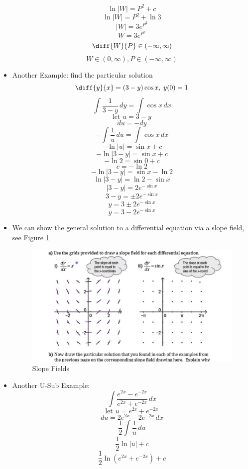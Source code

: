 \documentclass{article}
\newcommand{\letv}[1]{\text{let }#1 = }
\begin{document}
\begin{itemize}
        \[\ln|W| = P^2+c\]
        \[\ln|W| = P^2+\ln3\]
        \[|W| = 3e^{P^2}\]
        \[W = 3e^{P^2}\]
        \[\diff{W}{P}\in(-\infty,\infty)\]
        \[W\in(0,\infty), P\in(-\infty,\infty)\]
    \item Another Example: find the particular solution
        \[\diff{y}{x} = (3-y)\cos x,\;y(0) = 1\]
        \[\int\frac{1}{3-y}\,dy = \int\cos x\,dx\]
        \[\letv{u}3-y\]
        \[du = -dy\]
        \[-\int\frac{1}{u}\,du = \int\cos x\,dx\]
        \[-\ln|u| = \sin x+c\]
        \[-\ln|3-y| = \sin x+c\]
        \[-\ln2 = \sin0+c\]
        \[c = -\ln2\]
        \[-\ln|3-y| = \sin x-\ln2\]
        \[\ln|3-y| = \ln2-\sin x\]
        \[|3-y| = 2e^{-\sin x}\]
        \[3-y = \pm2e^{-\sin x}\]
        \[y = 3\pm2e^{-\sin x}\]
        \[y = 3-2e^{-\sin x}\]
    \item We can show the general solution to a differential equation via a slope field, see Figure \ref{fig:slopeFields}
    \begin{figure}[h]
        \centering
        \includegraphics[width=0.5\linewidth]{images/Slope Fields.jpg}
        \caption{Slope Fields}
        \label{fig:slopeFields}
    \end{figure}
    \item Another U-Sub Example:
        \[\int\frac{e^{2x}-e^{-2x}}{e^{2x}+e^{-2x}}\,dx\]
        \[\letv{u}e^{2x}+e^{-2x}\]
        \[du = 2e^{2x}-2e^{-2x}\,dx\]
        \[\frac{1}{2}\int\frac{1}{u}\,du\]
        \[\frac{1}{2}\ln|u|+c\]
        \[\boxed{\frac{1}{2}\ln\left(e^{2x}+e^{-2x}\right)+c}\]
\end{itemize}
\end{document}
